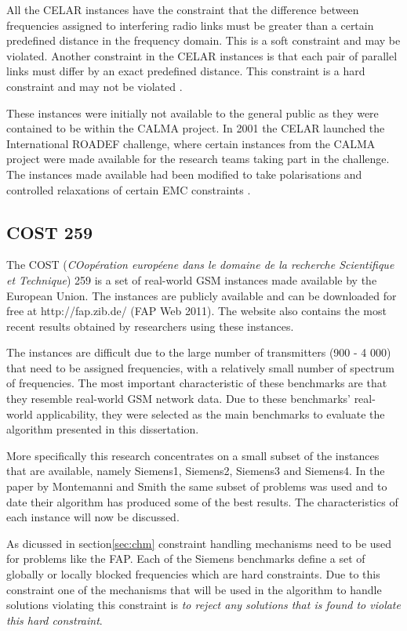 All the CELAR instances have the constraint that the difference between frequencies assigned to interfering radio links must be greater than a certain predefined distance in the frequency domain\cite{Karen2004}. This is a soft constraint and may be violated. Another constraint in the CELAR instances is that each pair of parallel links must differ by an exact predefined distance\cite{Karen2004}. This constraint is a hard constraint and may not be violated \cite{DynamicFAP}.

These instances were initially not available to the general public as they were contained to be within the CALMA project\cite{CALMA}. In 2001 the CELAR launched the International ROADEF challenge, where certain instances from the CALMA project were made available for the research teams taking part in the challenge\cite{CALMA}. The instances made available had been modified to take polarisations and controlled relaxations of certain EMC constraints \cite{LowerPolarFAP}.
\subsection{COST 259}
\label{sec:COST259}
The COST (\emph{COop{é}ration europ{é}ene dans le domaine de la recherche Scientifique et Technique}) 259 is a set of real-world GSM instances made available by the European Union. The instances are publicly available and can  be downloaded for free at http://fap.zib.de/ (FAP Web 2011). The website also contains the most recent results obtained by researchers using these instances\cite{Karen2004,Eisenblatter}.

The instances are difficult due to the large number of transmitters (900 - 4 000) that need to be assigned frequencies, with a relatively small number of spectrum of frequencies. The most important characteristic of these benchmarks are that they resemble real-world GSM network data. Due to these benchmarks' real-world applicability, they were selected as the main benchmarks to evaluate the algorithm presented in this dissertation.

More specifically this research concentrates on a small subset of the instances that are available, namely Siemens1, Siemens2, Siemens3 and Siemens4. In the paper by Montemanni and Smith \cite{TabuMontemanniSmith} the same subset of problems was used and to date their algorithm has produced some of the best results. The characteristics of each instance will now be discussed.

As dicussed in section\ref{sec:chm} constraint handling mechanisms need to be used for problems like the FAP. Each of the Siemens benchmarks define a set of globally or locally blocked frequencies which are hard constraints. Due to this constraint one of the mechanisms that will be used in the algorithm to handle solutions violating this constraint is \emph{to reject any solutions that is found to violate this hard constraint}.
